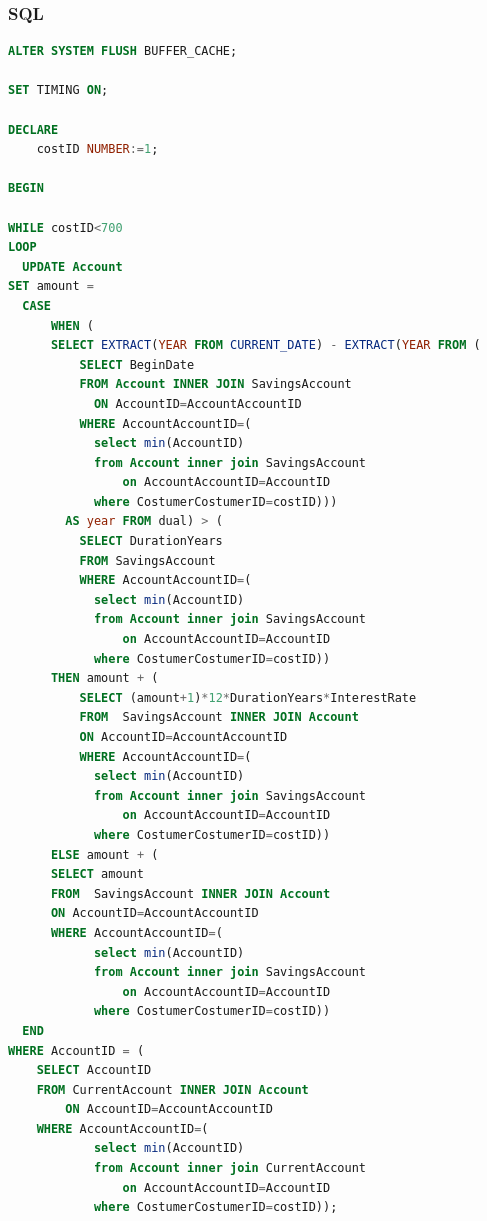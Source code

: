 \documentclass[a4paper, 10pt]{article}
\begin{document}
\subsubsection{SQL}
\begin{lstlisting}[language=SQL]
ALTER SYSTEM FLUSH BUFFER_CACHE;

SET TIMING ON;

DECLARE 
    costID NUMBER:=1;
    
BEGIN

WHILE costID<700
LOOP
  UPDATE Account 
SET amount =     
  CASE          
      WHEN (
      SELECT EXTRACT(YEAR FROM CURRENT_DATE) - EXTRACT(YEAR FROM (
          SELECT BeginDate 
          FROM Account INNER JOIN SavingsAccount 
            ON AccountID=AccountAccountID 
          WHERE AccountAccountID=(
            select min(AccountID) 
            from Account inner join SavingsAccount 
                on AccountAccountID=AccountID 
            where CostumerCostumerID=costID)))
        AS year FROM dual) > (
          SELECT DurationYears 
          FROM SavingsAccount 
          WHERE AccountAccountID=(
            select min(AccountID) 
            from Account inner join SavingsAccount 
                on AccountAccountID=AccountID 
            where CostumerCostumerID=costID))
      THEN amount + ( 
          SELECT (amount+1)*12*DurationYears*InterestRate 
          FROM  SavingsAccount INNER JOIN Account 
          ON AccountID=AccountAccountID 
          WHERE AccountAccountID=(
            select min(AccountID) 
            from Account inner join SavingsAccount 
                on AccountAccountID=AccountID 
            where CostumerCostumerID=costID))   
      ELSE amount + ( 
      SELECT amount 
      FROM  SavingsAccount INNER JOIN Account 
      ON AccountID=AccountAccountID 
      WHERE AccountAccountID=(
            select min(AccountID) 
            from Account inner join SavingsAccount 
                on AccountAccountID=AccountID 
            where CostumerCostumerID=costID)) 
  END 
WHERE AccountID = (
    SELECT AccountID 
    FROM CurrentAccount INNER JOIN Account 
        ON AccountID=AccountAccountID 
    WHERE AccountAccountID=(
            select min(AccountID) 
            from Account inner join CurrentAccount 
                on AccountAccountID=AccountID 
            where CostumerCostumerID=costID));


\end{lstlisting}
\end{document}
